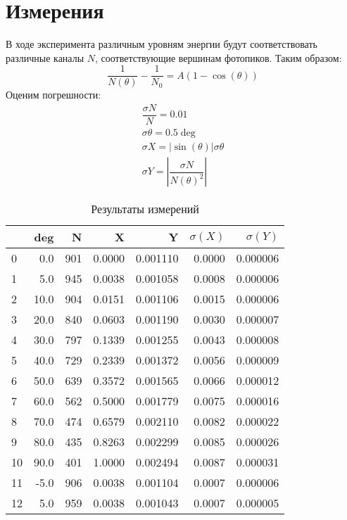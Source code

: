 \documentclass[12pt]{article}
\begin{document}
		\section*{Измерения}
		В ходе эксперимента различным уровням энергии будут соответствовать различные каналы $N$, соответствующие вершинам фотопиков.
		Таким образом:
		\begin{equation}
			\dfrac{1}{N(\theta)} - \dfrac{1}{N_0} = A(1 - \cos(\theta))
		\end{equation}
		Оценим погрешности:
		\begin{eqnarray}
			\dfrac{\sigma N}{N} = 0.01 \\
			\sigma \theta = 0.5 \deg
			\\
			\sigma X = |\sin(\theta)|\sigma\theta \\
			\sigma Y = \left|\dfrac{\sigma N}{N(\theta)^2}\right|
		\end{eqnarray}
	\begin {table}
 	\caption {Результаты измерений} \label{tab:title} 
	\begin{center}
	
{
		\begin{tabular}{lrrrrrr}
	\toprule
	
&	deg & N & X & Y & $\sigma(X)$ & $ \sigma(Y)$ \\
\midrule
0  &   0.0 &  901 &  0.0000 &  0.001110 &     0.0000 &     0.000006 \\
1  &   5.0 &  945 &  0.0038 &  0.001058 &     0.0008 &     0.000006 \\
2  &  10.0 &  904 &  0.0151 &  0.001106 &     0.0015 &     0.000006 \\
3  &  20.0 &  840 &  0.0603 &  0.001190 &     0.0030 &     0.000007 \\
4  &  30.0 &  797 &  0.1339 &  0.001255 &     0.0043 &     0.000008 \\
5  &  40.0 &  729 &  0.2339 &  0.001372 &     0.0056 &     0.000009 \\
6  &  50.0 &  639 &  0.3572 &  0.001565 &     0.0066 &     0.000012 \\
7  &  60.0 &  562 &  0.5000 &  0.001779 &     0.0075 &     0.000016 \\
8  &  70.0 &  474 &  0.6579 &  0.002110 &     0.0082 &     0.000022 \\
9  &  80.0 &  435 &  0.8263 &  0.002299 &     0.0085 &     0.000026 \\
10 &  90.0 &  401 &  1.0000 &  0.002494 &     0.0087 &     0.000031 \\
11 &  -5.0 &  906 &  0.0038 &  0.001104 &     0.0007 &     0.000006 \\
12 &   5.0 &  959 &  0.0038 &  0.001043 &     0.0007 &     0.000005 \\
\bottomrule
		\end{tabular}}
	
	\end{center}
\end{table}
\\\bigskip
\end{document}
